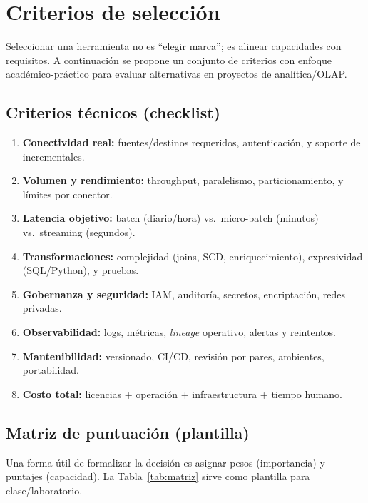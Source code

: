 \documentclass[12pt]{article}
\begin{document}
\section{Criterios de selección}
Seleccionar una herramienta no es “elegir marca”; es alinear capacidades con requisitos. A continuación se propone un conjunto de criterios con enfoque académico-práctico para evaluar alternativas en proyectos de analítica/OLAP.

\subsection{Criterios técnicos (checklist)}
\begin{enumerate}[label=\textbf{S\arabic*.}, leftmargin=*]
  \item \textbf{Conectividad real:} fuentes/destinos requeridos, autenticación, y soporte de incrementales.
  \item \textbf{Volumen y rendimiento:} throughput, paralelismo, particionamiento, y límites por conector.
  \item \textbf{Latencia objetivo:} batch (diario/hora) vs.\ micro-batch (minutos) vs.\ streaming (segundos).
  \item \textbf{Transformaciones:} complejidad (joins, SCD, enriquecimiento), expresividad (SQL/Python), y pruebas.
  \item \textbf{Gobernanza y seguridad:} IAM, auditoría, secretos, encriptación, redes privadas.
  \item \textbf{Observabilidad:} logs, métricas, \textit{lineage} operativo, alertas y reintentos.
  \item \textbf{Mantenibilidad:} versionado, CI/CD, revisión por pares, ambientes, portabilidad.
  \item \textbf{Costo total:} licencias + operación + infraestructura + tiempo humano.
\end{enumerate}

\subsection{Matriz de puntuación (plantilla)}
Una forma útil de formalizar la decisión es asignar pesos (importancia) y puntajes (capacidad). La Tabla~\ref{tab:matriz} sirve como plantilla para clase/laboratorio.
\end{document}
